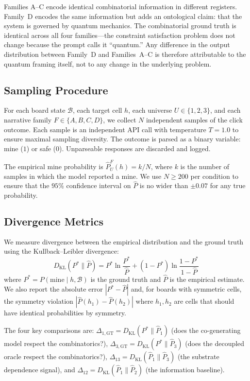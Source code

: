 \documentclass[12pt,a4paper]{article}
\begin{document}
Families A--C encode identical combinatorial information in different registers. Family~D encodes the same information but adds an ontological claim: that the system is governed by quantum mechanics. The combinatorial ground truth is identical across all four families---the constraint satisfaction problem does not change because the prompt calls it ``quantum.'' Any difference in the output distribution between Family~D and Families~A--C is therefore attributable to the quantum framing itself, not to any change in the underlying problem.

\subsection{Sampling Procedure}
\label{sec:sampling}

For each board state $\mathcal{B}$, each target cell $h$, each universe $U \in \{1, 2, 3\}$, and each narrative family $F \in \{A, B, C, D\}$, we collect $N$ independent samples of the click outcome. Each sample is an independent API call with temperature $T = 1.0$ to ensure maximal sampling diversity. The outcome is parsed as a binary variable: mine ($1$) or safe ($0$). Unparseable responses are discarded and logged.

The empirical mine probability is $\hat{P}_U^F(h) = k/N$, where $k$ is the number of samples in which the model reported a mine. We use $N \geq 200$ per condition to ensure that the $95\%$ confidence interval on $\hat{P}$ is no wider than $\pm 0.07$ for any true probability.

\subsection{Divergence Metrics}
\label{sec:metrics}

We measure divergence between the empirical distribution and the ground truth using the Kullback--Leibler divergence:
\begin{equation}
D_{\mathrm{KL}}(P^* \| \hat{P}) = P^* \ln\frac{P^*}{\hat{P}} + (1-P^*) \ln\frac{1-P^*}{1-\hat{P}}
\end{equation}
where $P^* = P(\text{mine} \mid h, \mathcal{B})$ is the ground truth and $\hat{P}$ is the empirical estimate. We also report the absolute error $|P^* - \hat{P}|$ and, for boards with symmetric cells, the symmetry violation $|\hat{P}(h_1) - \hat{P}(h_2)|$ where $h_1, h_2$ are cells that should have identical probabilities by symmetry.

The four key comparisons are: $\Delta_{1,\text{GT}} = D_{\mathrm{KL}}(P^* \| \hat{P}_1)$ (does the co-generating model respect the combinatorics?), $\Delta_{3,\text{GT}} = D_{\mathrm{KL}}(P^* \| \hat{P}_3)$ (does the decoupled oracle respect the combinatorics?), $\Delta_{13} = D_{\mathrm{KL}}(\hat{P}_1 \| \hat{P}_3)$ (the substrate dependence signal), and $\Delta_{12} = D_{\mathrm{KL}}(\hat{P}_1 \| \hat{P}_2)$ (the information baseline).
\end{document}
